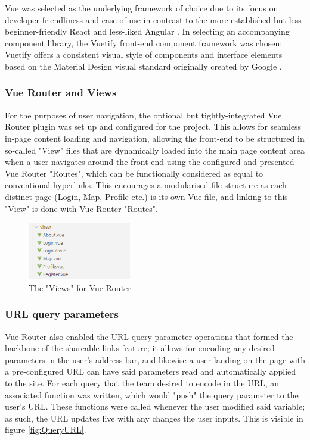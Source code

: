 \documentclass[]{UCD_CS_47360_Report}
\begin{document}
Vue was selected as the underlying framework of choice due to its focus on developer friendliness and ease of use in contrast to the more established but less beginner-friendly React and less-liked Angular \cite{SO-SurveyFrontEnd}. In selecting an accompanying component library, the Vuetify front-end component framework was chosen; Vuetify offers a consistent visual style of components and interface elements based on the Material Design visual standard originally created by Google \cite{MD}.


\subsubsection{Vue Router and Views}
For the purposes of user navigation, the optional but tightly-integrated Vue Router plugin was set up and configured for the project. This allows for seamless in-page content loading and navigation, allowing the front-end to be structured in so-called "View" files that are dynamically loaded into the main page content area when a user navigates around the front-end using the configured and presented Vue Router "Routes", which can be functionally considered as equal to conventional hyperlinks. This encourages a modularised file structure as each distinct page (Login, Map, Profile etc.) is its own Vue file, and linking to this "View" is done with Vue Router "Routes". 

\begin{figure}[!htb]
    \centering
    \includegraphics[width=0.4\textwidth]{figures/vueRouterViews.PNG}
    \caption{The "Views" for Vue Router}
    \label{fig:RouterViews}
\end{figure}

\subsubsection{URL query parameters}
Vue Router also enabled the URL query parameter operations that formed the backbone of the shareable links feature; it allows for encoding any desired parameters in the user's address bar, and likewise a user landing on the page with a pre-configured URL can have said parameters read and automatically applied to the site. For each query that the team desired to encode in the URL, an associated function was written, which would "push" the query parameter to the user's URL. These functions were called whenever the user modified said variable; as such, the URL updates live with any changes the user inputs. This is visible in figure \ref{fig:QueryURL}.
\end{document}
